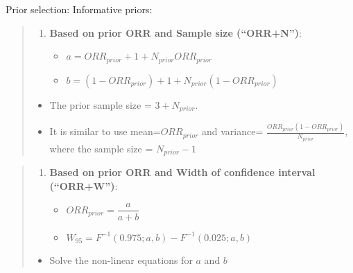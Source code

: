 \begin{frame}{Prior selection: Informative priors:}

\begin{quote}
\begin{enumerate}
\def\labelenumi{\arabic{enumi}.}
\setcounter{enumi}{2}
\tightlist
\item
  \textbf{Based on prior ORR and Sample size (``ORR+N'')}:

  \begin{itemize}
  \tightlist
  \item
    \(a=ORR_{prior}+1+N_{prior}ORR_{prior}\)
  \item
    \(b=(1-ORR_{prior})+1+N_{prior}(1-ORR_{prior})\)
  \end{itemize}
\end{enumerate}

\begin{itemize}
\tightlist
\item
  The prior sample size = \(3+N_{prior}\).
\item
  It is similar to use mean=\(ORR_{prior}\) and variance=
  \(\frac{ORR_{prior}(1-ORR_{prior})}{N_{prior}}\), where the sample
  size = \(N_{prior}-1\)
\end{itemize}
\end{quote}

\begin{quote}
\begin{enumerate}
\def\labelenumi{\arabic{enumi}.}
\setcounter{enumi}{3}
\tightlist
\item
  \textbf{Based on prior ORR and Width of confidence interval
  (``ORR+W'')}:

  \begin{itemize}
  \tightlist
  \item
    \(ORR_{prior}=\dfrac{a}{a+b}\)
  \item
    \(W_{95}=F^{-1}(0.975; a,b)-F^{-1}(0.025; a,b)\)
  \end{itemize}
\end{enumerate}

\begin{itemize}
\tightlist
\item
  Solve the non-linear equations for \(a\) and \(b\)
\end{itemize}
\end{quote}

\end{frame}

